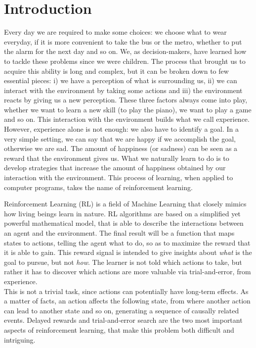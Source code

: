\chapter{Introduction}
\label{ch:intro}
\setcounter{page}{1}


Every day we are required to make some choices:  we choose what to wear everyday, if it is more convenient to take the bus or the metro, whether to put the alarm for the next day and so on. We, as decision-makers, have learned how to tackle these problems since we were children. The process that brought us to acquire this ability is long and complex, but it can be broken down to few essential pieces: i) we have a perception of what is surrounding us, ii) we can interact with the environment by taking some actions and iii) the environment reacts by giving us a new perception. These three factors always come into play, whether we want to learn a new skill (\eg to play the piano), we want to play a game and so on. This interaction with the environment builds what we call experience. However, experience alone is not enough: we also have to identify a goal. In a very simple setting, we can say that we are happy if we accomplish the goal, otherwise we are sad. The amount of happiness (or sadness) can be seen as a reward that the environment gives us. What we naturally learn to do is to develop strategies that increase the amount of happiness obtained by our interaction with the environment. This process of learning, when applied to computer programs, takes the name of reinforcement learning.



Reinforcement Learning (RL) is a field of Machine Learning that closely mimics how living beings learn in nature. RL algorithms are based on a simplified yet powerful mathematical model, that is able to describe the interactions between an agent and the environment.
%
The final result will be a function that maps states to actions, telling the agent what to do, so as to maximize the reward that it is able to gain. This reward signal is intended to give insights about \textit{what} is the goal to pursue, but not \textit{how}. The learner is not told which actions to take, but rather it has to discover which actions are more valuable via trial-and-error, from experience. \\
This is not a trivial task, since actions can potentially have long-term effects. As a matter of facts, an action affects the following state, from where another action can lead to another state and so on, generating a sequence of causally related events. Delayed rewards and trial-and-error search are the two most important aspects of reinforcement learning, that make this problem both difficult and intriguing.

